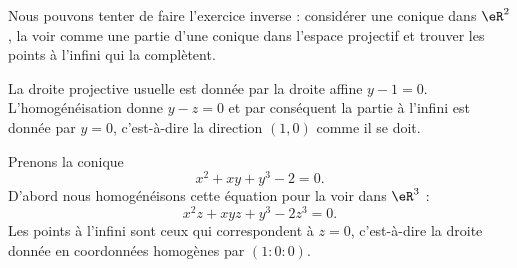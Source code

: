 Nous pouvons tenter de faire l'exercice inverse : considérer une conique dans \( \eR^2\), la voir comme une partie d'une conique dans l'espace projectif et trouver les points à l'infini qui la complètent.

\begin{example}
	La droite projective usuelle est donnée par la droite affine \( y-1=0\). L'homogénéisation donne \( y-z=0\) et par conséquent la partie à l'infini est donnée par \( y=0\), c'est-à-dire la direction \( (1,0)\) comme il se doit.
\end{example}

\begin{example}
	Prenons la conique
	\begin{equation}
		x^2+xy+y^3-2=0.
	\end{equation}
	D'abord nous homogénéisons cette équation pour la voir dans \( \eR^3\) :
	\begin{equation}
		x^2z+xyz+y^3-2z^3=0.
	\end{equation}
	Les points à l'infini sont ceux qui correspondent à \( z=0\), c'est-à-dire la droite donnée en coordonnées homogènes par \( (1:0:0)\).
\end{example}
